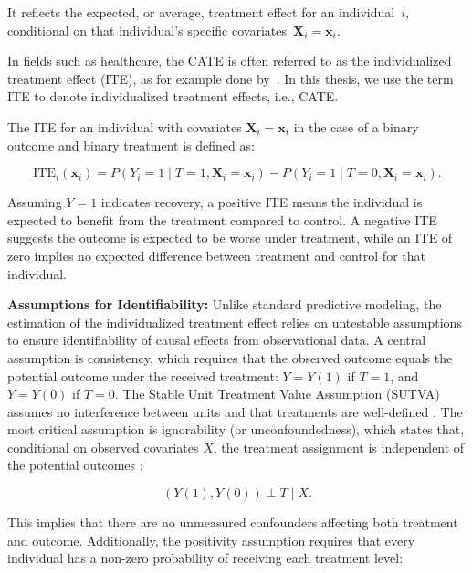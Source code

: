 It reflects the expected, or average, treatment effect for an individual~$i$, conditional on that individual's specific covariates~$\mathbf{X}_i = \mathbf{x}_i$.

In fields such as healthcare, the CATE is often referred to as the individualized treatment effect (ITE), as for example done by~\citet{hoogland2021}. In this thesis, we use the term ITE to denote individualized treatment effects, i.e., CATE.

The ITE for an individual with covariates $\mathbf{X}_i = \mathbf{x}_i$ in the case of a binary outcome and binary treatment is defined as:

\begin{equation}
\text{ITE}_i(\mathbf{x}_i) = P(Y_i = 1 \mid T = 1, \mathbf{X}_i = \mathbf{x}_i) - P(Y_i = 1 \mid T = 0, \mathbf{X}_i = \mathbf{x}_i).
\end{equation}

Assuming $Y = 1$ indicates recovery, a positive ITE means the individual is expected to benefit from the treatment compared to control. A negative ITE suggests the outcome is expected to be worse under treatment, while an ITE of zero implies no expected difference between treatment and control for that individual.

\medskip

\textbf{Assumptions for Identifiability:} Unlike standard predictive modeling, the estimation of the individualized treatment effect relies on untestable assumptions to ensure identifiability of causal effects from observational data. A central assumption is consistency, which requires that the observed outcome equals the potential outcome under the received treatment: $Y = Y(1)$ if $T = 1$, and $Y = Y(0)$ if $T = 0$. The Stable Unit Treatment Value Assumption (SUTVA) assumes no interference between units and that treatments are well-defined \citep{rubin1980}. The most critical assumption is ignorability (or unconfoundedness), which states that, conditional on observed covariates $X$, the treatment assignment is independent of the potential outcomes \citep{rosenbaum1983}:

\begin{equation}
(Y(1), Y(0)) \perp T \mid X.
\end{equation}

This implies that there are no unmeasured confounders affecting both treatment and outcome. Additionally, the positivity assumption requires that every individual has a non-zero probability of receiving each treatment level:

